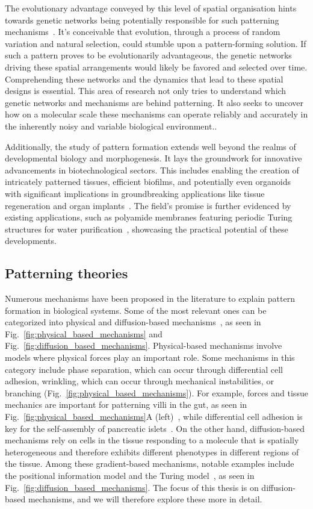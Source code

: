The evolutionary advantage conveyed by this level of spatial organisation hints towards genetic networks being potentially responsible for such patterning mechanisms~\parencite{caro2005adaptive}.
It's conceivable that evolution, through a process of random variation and natural selection, could stumble upon a pattern-forming solution.
If such a pattern proves to be evolutionarily advantageous, the genetic networks driving these spatial arrangements would likely be favored and selected over time.
Comprehending these networks and the dynamics that lead to these spatial designs is essential.
This area of research not only tries to understand which genetic networks and mechanisms are behind patterning.
It also seeks to uncover how on a molecular scale these mechanisms can operate reliably and accurately in the inherently noisy and variable biological environment..

Additionally, the study of pattern formation extends well beyond the realms of developmental biology and morphogenesis.
It lays the groundwork for innovative advancements in biotechnological sectors.
This includes enabling the creation of intricately patterned tissues, efficient biofilms, and potentially even organoids with significant implications in groundbreaking applications like tissue regeneration and organ implants~\parencite{Scholes2017}.
The field's promise is further evidenced by existing applications, such as polyamide membranes featuring periodic Turing structures for water purification~\parencite{Tan2018}, showcasing the practical potential of these developments.

\subsection{Patterning theories}
Numerous mechanisms have been proposed in the literature to explain pattern formation in biological systems.
Some of the most relevant ones can be categorized into physical and diffusion-based mechanisms~\parencite{hiscock2015mathematically, Scholes2017}, as seen in Fig.~\ref{fig:physical_based_mechanisms} and Fig.~\ref{fig:diffusion_based_mechanisms}.
Physical-based mechanisms involve models where physical forces play an important role.
Some mechanisms in this category include phase separation, which can occur through differential cell adhesion, wrinkling, which can occur through mechanical instabilities, or branching (Fig.~\ref{fig:physical_based_mechanisms}).
For example, forces and tissue mechanics are important for patterning villi in the gut, as seen in Fig.~\ref{fig:physical_based_mechanisms}A (left)~\parencite{shyer2013villification}, while differential cell adhesion is key for the self-assembly of pancreatic islets~\parencite{jia2007tissue}.
On the other hand, diffusion-based mechanisms rely on cells in the tissue responding to a molecule that is spatially heterogeneous and therefore exhibits different phenotypes in different regions of the tissue.
Among these gradient-based mechanisms, notable examples include the positional information model and the Turing model~\parencite{Wolpert1969, Turing1952}, as seen in Fig.~\ref{fig:diffusion_based_mechanisms}.
The focus of this thesis is on diffusion-based mechanisms, and we will therefore explore these more in detail.

